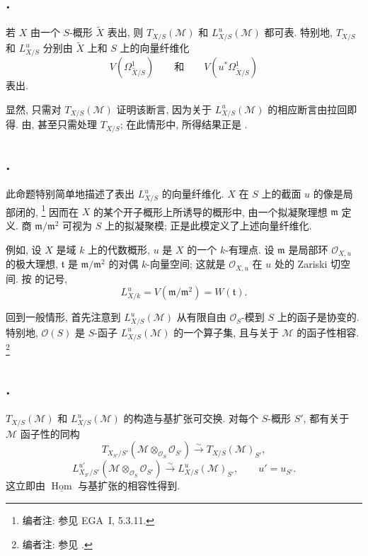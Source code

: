 \subsection*{.}
若 \(X\) 由一个 \(S\)-概形 \(\widetilde X\) 表出, 则
\(T_{X/S}(\mathcal M)\) 和 \(L^u_{X/S}(\mathcal M)\) 都可表.
特别地, \(T_{X/S}\) 和 \(L^u_{X/S}\) 分别由
\(\widetilde X\) 上和 \(S\) 上的向量纤维化
\[
  V(\Omega^1_{\widetilde X/S})
  \qquad\text{和}\qquad
  V(u^*\Omega^1_{\widetilde X/S})
\]
表出.

显然, 只需对 \(T_{X/S}(\mathcal M)\) 证明该断言,
因为关于 \(L^u_{X/S}(\mathcal M)\) 的相应断言由拉回即得.
由,
甚至只需处理 \(T_{X/S}\); 在此情形中, 所得结果正是
.

\subsection*{.}
此命题特别简单地描述了表出 \(L^u_{X/S}\) 的向量纤维化.
\(X\) 在 \(S\) 上的截面 \(u\) 的像是局部闭的,
\footnote{编者注: 参见 EGA~I, 5.3.11.}
因而在 \(X\) 的某个开子概形上所诱导的概形中, 由一个拟凝聚理想
\(\mathfrak m\) 定义. 商 \(\mathfrak m/\mathfrak m^2\)
可视为 \(S\) 上的拟凝聚模; 正是此模定义了上述向量纤维化.

例如, 设 \(X\) 是域 \(k\) 上的代数概形, \(u\) 是 \(X\) 的一个
\(k\)-有理点. 设 \(\mathfrak m\) 是局部环
\(\mathcal O_{X,u}\) 的极大理想, \(\mathfrak t\) 是
\(\mathfrak m/\mathfrak m^2\) 的对偶 \(k\)-向量空间;
这就是 \(\mathcal O_{X,u}\) 在 \(u\) 处的 Zariski 切空间.
按  的记号,
\[
  L^u_{X/k}=V(\mathfrak m/\mathfrak m^2)=W(\mathfrak t).
\]

回到一般情形, 首先注意到 \(L^u_{X/S}(\mathcal M)\)
从有限自由 \(\mathcal O_S\)-模到 \(S\) 上的函子是协变的.
特别地, \(\mathcal O(S)\) 是 \(S\)-函子
\(L^u_{X/S}(\mathcal M)\) 的一个算子集,
且与关于 \(\mathcal M\) 的函子性相容.
\footnote{编者注: 参见 .}

\subsection*{.}
\(T_{X/S}(\mathcal M)\) 和 \(L^u_{X/S}(\mathcal M)\) 的构造与基扩张可交换.
对每个 \(S\)-概形 \(S'\), 都有关于 \(\mathcal M\) 函子性的同构
\[
  T_{X_{S'}/S'}(\mathcal M\otimes_{\mathcal O_S}\mathcal O_{S'})
    \xrightarrow{\sim} T_{X/S}(\mathcal M)_{S'},
\]
\[
  L^{u'}_{X_{S'}/S'}(\mathcal M\otimes_{\mathcal O_S}\mathcal O_{S'})
    \xrightarrow{\sim} L^u_{X/S}(\mathcal M)_{S'},
  \qquad u'=u_{S'}.
\]
这立即由 \(\underline{\operatorname{Hom}}\) 与基扩张的相容性得到.

